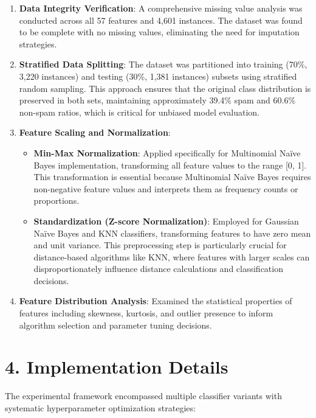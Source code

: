 \documentclass[11pt]{article}
\begin{document}
\begin{enumerate}
    \item \textbf{Data Integrity Verification}: A comprehensive missing value analysis was conducted across all 57 features and 4,601 instances. The dataset was found to be complete with no missing values, eliminating the need for imputation strategies.
    
    \item \textbf{Stratified Data Splitting}: The dataset was partitioned into training (70\%, 3,220 instances) and testing (30\%, 1,381 instances) subsets using stratified random sampling. This approach ensures that the original class distribution is preserved in both sets, maintaining approximately 39.4\% spam and 60.6\% non-spam ratios, which is critical for unbiased model evaluation.
    
    \item \textbf{Feature Scaling and Normalization}:
    \begin{itemize}
        \item \textbf{Min-Max Normalization}: Applied specifically for Multinomial Na\"ive Bayes implementation, transforming all feature values to the range [0, 1]. This transformation is essential because Multinomial Na\"ive Bayes requires non-negative feature values and interprets them as frequency counts or proportions.
        
        \item \textbf{Standardization (Z-score Normalization)}: Employed for Gaussian Na\"ive Bayes and KNN classifiers, transforming features to have zero mean and unit variance. This preprocessing step is particularly crucial for distance-based algorithms like KNN, where features with larger scales can disproportionately influence distance calculations and classification decisions.
    \end{itemize}
    
    \item \textbf{Feature Distribution Analysis}: Examined the statistical properties of features including skewness, kurtosis, and outlier presence to inform algorithm selection and parameter tuning decisions.
\end{enumerate}

\section*{4. Implementation Details}
The experimental framework encompassed multiple classifier variants with systematic hyperparameter optimization strategies:
\end{document}
